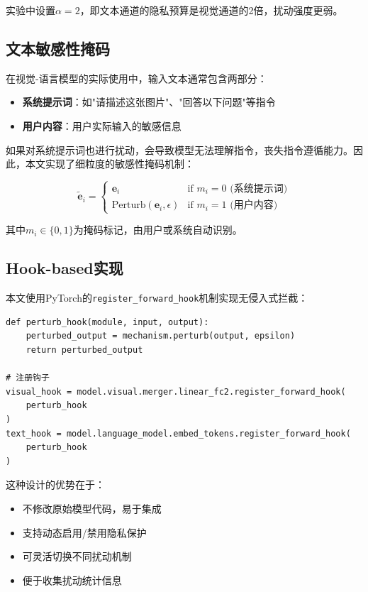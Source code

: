 \documentclass[a4paper,12pt]{article}
\begin{document}
实验中设置$\alpha = 2$，即文本通道的隐私预算是视觉通道的2倍，扰动强度更弱。

\subsection{文本敏感性掩码}

在视觉-语言模型的实际使用中，输入文本通常包含两部分：
\begin{itemize}
  \item \textbf{系统提示词}：如"请描述这张图片"、"回答以下问题"等指令
  \item \textbf{用户内容}：用户实际输入的敏感信息
\end{itemize}

如果对系统提示词也进行扰动，会导致模型无法理解指令，丧失指令遵循能力。因此，本文实现了细粒度的敏感性掩码机制：

\begin{equation}
\tilde{\mathbf{e}}_i = \begin{cases}
\mathbf{e}_i & \text{if } m_i = 0 \text{ (系统提示词)} \\
\text{Perturb}(\mathbf{e}_i, \epsilon) & \text{if } m_i = 1 \text{ (用户内容)}
\end{cases}
\end{equation}

其中$m_i \in \{0, 1\}$为掩码标记，由用户或系统自动识别。

\subsection{Hook-based实现}

本文使用PyTorch的\texttt{register\_forward\_hook}机制实现无侵入式拦截：

\begin{verbatim}
def perturb_hook(module, input, output):
    perturbed_output = mechanism.perturb(output, epsilon)
    return perturbed_output

# 注册钩子
visual_hook = model.visual.merger.linear_fc2.register_forward_hook(
    perturb_hook
)
text_hook = model.language_model.embed_tokens.register_forward_hook(
    perturb_hook
)
\end{verbatim}

这种设计的优势在于：
\begin{itemize}
  \item 不修改原始模型代码，易于集成
  \item 支持动态启用/禁用隐私保护
  \item 可灵活切换不同扰动机制
  \item 便于收集扰动统计信息
\end{itemize}
\end{document}
